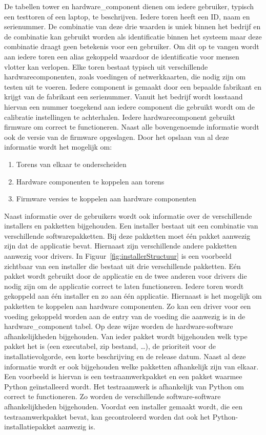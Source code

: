 De tabellen tower en hardware\_component dienen om iedere gebruiker, typisch een testtoren of een laptop, te beschrijven.
Iedere toren heeft een ID, naam en serienummer.
De combinatie van deze drie waarden is uniek binnen het bedrijf en de combinatie kan gebruikt worden als identificatie binnen het systeem maar deze combinatie draagt geen betekenis voor een gebruiker.
Om dit op te vangen wordt aan iedere toren een alias gekoppeld waardoor de identificatie voor mensen vlotter kan verlopen.
Elke toren bestaat typisch uit verschillende hardwarecomponenten, zoals voedingen of netwerkkaarten, die nodig zijn om testen uit te voeren.
Iedere component is gemaakt door een bepaalde fabrikant en krijgt van de fabrikant een serienummer.
Vanuit het bedrijf wordt losstaand hiervan een nummer toegekend aan iedere component die gebruikt wordt om de calibratie instellingen te achterhalen.
Iedere hardwarecomponent gebruikt firmware om correct te functioneren.
Naast alle bovengenoemde informatie wordt ook de versie van de firmware opgeslagen.
Door het opslaan van al deze informatie wordt het mogelijk om:
\begin{enumerate}
\item Torens van elkaar te onderscheiden
\item Hardware componenten te koppelen aan torens
\item Firmware versies te koppelen aan hardware componenten
\end{enumerate}

Naast informatie over de gebruikers wordt ook informatie over de verschillende installers en pakketten bijgehouden.
Een installer bestaat uit een combinatie van verschillende softwarepakketten.
Bij deze pakketten moet één pakket aanwezig zijn dat de applicatie bevat.
Hiernaast zijn verschillende andere pakketten aanwezig voor drivers.
In Figuur~\ref{fig:installerStructuur} is een voorbeeld zichtbaar van een installer die bestaat uit drie verschillende pakketten.
Eén pakket wordt gebruikt door de applicatie en de twee anderen voor drivers die nodig zijn om de applicatie correct te laten functioneren.
Iedere toren wordt gekoppeld aan één installer en zo aan één applicatie.
Hiernaast is het mogelijk om pakketten te koppelen aan hardware componenten.
Zo kan een driver voor een voeding gekoppeld worden aan de entry van de voeding die aanwezig is in de hardware\_component tabel.
Op deze wijze worden de hardware-software afhankelijkheden bijgehouden.
Van ieder pakket wordt bijgehouden welk type pakket het is (een executabel, zip bestand, \ldots), de prioriteit voor de installatievolgorde, een korte beschrijving en de release datum.
Naast al deze informatie wordt er ook bijgehouden welke pakketten afhankelijk zijn van elkaar.
Een voorbeeld is hiervan is een testraamwerkpakket en een pakket waarmee Python geïnstalleerd wordt.
Het testraamwerk is afhankelijk van Python om correct te functioneren.
Zo worden de verschillende software-software afhankelijkheden bijgehouden.
Voordat een installer gemaakt wordt, die een testraamwerkpakket bevat, kan gecontroleerd worden dat ook het Python-installatiepakket aanwezig is.

